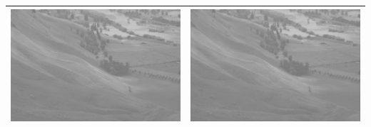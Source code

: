 \documentclass[brazil,times]{abnt}
\begin{document}
\begin{table}[ht]
\begin{tabular}{|c|c|}
			\hline
			\includegraphics[scale=0.2]{imagens/hawkes.jpg}&\includegraphics[scale=0.2]{imagens/hawkes-blur.jpg}\\
			\hline

\end{tabular}
\end{table}
\end{document}
